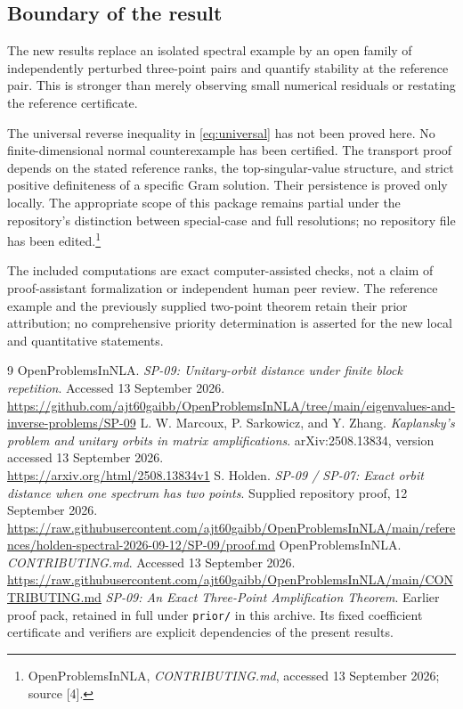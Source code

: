 \documentclass[11pt]{article}
\theoremstyle{remark}\newtheorem{remark}[theorem]{Remark}
\begin{document}
\subsection{Boundary of the result}
The new results replace an isolated spectral example by an open family of independently perturbed three-point pairs and quantify stability at the reference pair. This is stronger than merely observing small numerical residuals or restating the reference certificate.

The universal reverse inequality in \eqref{eq:universal} has not been proved here. No finite-dimensional normal counterexample has been certified. The transport proof depends on the stated reference ranks, the top-singular-value structure, and strict positive definiteness of a specific Gram solution. Their persistence is proved only locally. The appropriate scope of this package remains partial under the repository's distinction between special-case and full resolutions; no repository file has been edited.\footnote{OpenProblemsInNLA, \emph{CONTRIBUTING.md}, accessed 13 September 2026; source [4].}

The included computations are exact computer-assisted checks, not a claim of proof-assistant formalization or independent human peer review. The reference example and the previously supplied two-point theorem retain their prior attribution; no comprehensive priority determination is asserted for the new local and quantitative statements.

\begin{thebibliography}{9}
 OpenProblemsInNLA. \emph{SP-09: Unitary-orbit distance under finite block repetition}. Accessed 13 September 2026.\\
\url{https://github.com/ajt60gaibb/OpenProblemsInNLA/tree/main/eigenvalues-and-inverse-problems/SP-09}
 L. W. Marcoux, P. Sarkowicz, and Y. Zhang. \emph{Kaplansky's problem and unitary orbits in matrix amplifications}. arXiv:2508.13834, version accessed 13 September 2026.\\
\url{https://arxiv.org/html/2508.13834v1}
 S. Holden. \emph{SP-09 / SP-07: Exact orbit distance when one spectrum has two points}. Supplied repository proof, 12 September 2026.\\
\url{https://raw.githubusercontent.com/ajt60gaibb/OpenProblemsInNLA/main/references/holden-spectral-2026-09-12/SP-09/proof.md}
 OpenProblemsInNLA. \emph{CONTRIBUTING.md}. Accessed 13 September 2026.\\
\url{https://raw.githubusercontent.com/ajt60gaibb/OpenProblemsInNLA/main/CONTRIBUTING.md}
 \emph{SP-09: An Exact Three-Point Amplification Theorem}. Earlier proof pack, retained in full under \texttt{prior/} in this archive. Its fixed coefficient certificate and verifiers are explicit dependencies of the present results.
\end{thebibliography}
\end{document}
